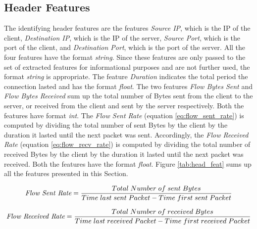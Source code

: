 \subsection{Header Features} \label{head_feat}
The identifying header features are the features \textit{Source IP}, which is the IP of the client, \textit{Destination IP}, which is the IP of the server, \textit{Source Port}, which is the port of the client, and \textit{Destination Port}, which is the port of the server. All the four features have the format \textit{string}. Since these features are only passed to the set of extracted features for informational purposes and are not further used, the format \textit{string} is appropriate. The feature \textit{Duration} indicates the total period the connection lasted and has the format \textit{float}. The two features \textit{Flow Bytes Sent} and \textit{Flow Bytes Received} sum up the total number of Bytes sent from the client to the server, or received from the client and sent by the server respectively. Both the features have format \textit{int}. The \textit{Flow Sent Rate} (equation \ref{eq:flow_sent_rate}) is computed by dividing the total number of sent Bytes by the client by the duration it lasted until the next packet was sent. Accordingly, the \textit{Flow Received Rate} (equation \ref{eq:flow_recv_rate}) is computed by dividing the total number of received Bytes by the client by the duration it lasted until the next packet was received. Both the features have the format \textit{float}. Figure \ref{tab:head_feat} sums up all the features presented in this Section.

\begin{equation}
\textit{\textit{Flow Sent Rate}} = \frac{Total \; Number \; of \; sent \; Bytes}{Time \; last \; sent \; Packet - Time \; first \; sent \; Packet}
\label{eq:flow_sent_rate}
\end{equation}

\begin{equation}
\textit{\textit{Flow Received Rate}} = \frac{Total \; Number \; of \; received \; Bytes}{Time \; last \; received \; Packet - Time \; first \; received \; Packet}
\label{eq:flow_recv_rate}
\end{equation}

